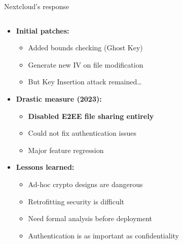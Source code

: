 \documentclass[aspectratio=169, lualatex, handout]{beamer}
\begin{document}
\begin{frame}{Nextcloud's response}
	\begin{columns}[c]
		\begin{column}{1\textwidth}
			\begin{itemize}
				\item \textbf{Initial patches:}
				      \begin{itemize}
					      \item Added bounds checking (Ghost Key)
					      \item Generate new IV on file modification
					      \item But Key Insertion attack remained\ldots
				      \end{itemize}
				\item \textbf{Drastic measure (2023):}
				      \begin{itemize}
					      \item \textbf{Disabled E2EE file sharing entirely}
					      \item Could not fix authentication issues
					      \item Major feature regression
				      \end{itemize}
				\item \textbf{Lessons learned:}
				      \begin{itemize}
					      \item Ad-hoc crypto designs are dangerous
					      \item Retrofitting security is difficult
					      \item Need formal analysis before deployment
					      \item Authentication is as important as confidentiality
				      \end{itemize}
			\end{itemize}
		\end{column}
	\end{columns}
\end{frame}
\end{document}
